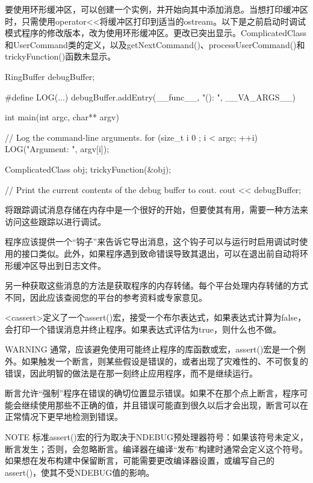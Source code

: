 
要使用环形缓冲区，可以创建一个实例，并开始向其中添加消息。当想打印缓冲区时，只需使用operator<{}<将缓冲区打印到适当的ostream。以下是之前启动时调试模式程序的修改版本，改为使用环形缓冲区。更改已突出显示。ComplicatedClass和UserCommand类的定义，以及getNextCommand()、processUserCommand()和trickyFunction()函数未显示。

\begin{cpp}
RingBuffer debugBuffer;

#define LOG(...) debugBuffer.addEntry(__func__, "(): ", __VA_ARGS__)

int main(int argc, char** argv)
{
    // Log the command-line arguments.
    for (size_t i { 0 }; i < argc; ++i) {
        LOG("Argument: ", argv[i]);
    }

    ComplicatedClass obj;
    trickyFunction(&obj);

    // Print the current contents of the debug buffer to cout.
    cout << debugBuffer;
}
\end{cpp}


将跟踪调试消息存储在内存中是一个很好的开始，但要使其有用，需要一种方法来访问这些跟踪以进行调试。

程序应该提供一个“钩子”来告诉它导出消息，这个钩子可以与运行时启用调试时使用的接口类似。此外，如果程序遇到致命错误导致其退出，可以在退出前自动将环形缓冲区导出到日志文件。

另一种获取这些消息的方法是获取程序的内存转储。每个平台处理内存转储的方式不同，因此应该查阅您的平台的参考资料或专家意见。


<cassert>定义了一个assert()宏，接受一个布尔表达式，如果表达式计算为false，会打印一个错误消息并终止程序。如果表达式评估为true，则什么也不做。

\begin{myWarning}{WARNING}
通常，应该避免使用可能终止程序的库函数或宏，assert()宏是一个例外。如果触发一个断言，则某些假设是错误的，或者出现了灾难性的、不可恢复的错误，因此明智的做法是在那一刻终止应用程序，而不是继续运行。
\end{myWarning}

断言允许“强制”程序在错误的确切位置显示错误。如果不在那个点上断言，程序可能会继续使用那些不正确的值，并且错误可能直到很久以后才会出现，断言可以在正常情况下更早地检测到错误。

\begin{myNotic}{NOTE}
标准assert()宏的行为取决于NDEBUG预处理器符号：如果该符号未定义，断言发生；否则，会忽略断言。编译器在编译“发布”构建时通常会定义这个符号。如果想在发布构建中保留断言，可能需要更改编译器设置，或编写自己的assert()，使其不受NDEBUG值的影响。
\end{myNotic}

